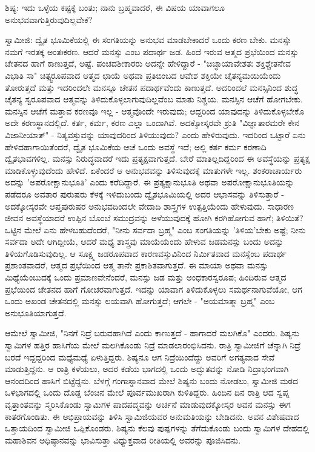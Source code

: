ಶಿಷ್ಯ: ಇದು ಒಳ್ಳೆಯ ಕಷ್ಟಕ್ಕೆ ಬಂತು; ನಾನು ಬ್ರಹ್ಮವಾದರೆ, ಈ ವಿಷಯ ಯಾವಾಗಲೂ ಅನುಭವವಾಗುತ್ತಿರುವುದಿಲ್ಲವೇಕೆ?

ಸ್ವಾಮೀಜಿ: ದ್ವೈತ ಭೂಮಿಕೆಯಲ್ಲಿ ಈ ಸಂಗತಿಯನ್ನು ಅನುಭವ ಮಾಡಬೇಕಾದರೆ ಒಂದು ಕರಣ ಬೇಕು. ಮನಸ್ಸೇ ನಮಗೆ ಇರತಕ್ಕ ಅಂತಃಕರಣ. ಆದರೆ ಮನಸ್ಸು ಎಂಬ ಪದಾರ್ಥ ಜಡ. ಹಿಂದೆ ಇರುವ ಆತ್ಮದ ಪ್ರಭೆಯಿಂದ ಮನಸ್ಸು ಚೇತನದ ಹಾಗೆ ಕಾಣುತ್ತದೆ, ಅಷ್ಟೆ. ಪಂಚದಶೀಕಾರರು ಅದನ್ನೇ ಹೇಳಿದ್ದಾರೆ - "ಚಿಚ್ಛಾಯಾವೇಶತಃ ಶಕ್ತಿಶ್ಚೇತನೇವ ವಿಭಾತಿ ಸಾ" ಚಿತ್ಸ್ವರೂಪವಾದ ಆತ್ಮದ ಛಾಯೆ ಅಥವಾ ಪ್ರತಿಬಿಂಬದ ಆವೇಶ ಶಕ್ತಿಯೇ ಚೈತನ್ಯಮಯಿಯೆಂದು ತೋರುತ್ತದೆ ಮತ್ತು ಇದರಿಂದಲೇ ಮನಸ್ಸೂ ಚೇತನ ಪದಾರ್ಥವೆಂದು ಕಾಣುತ್ತದೆ. ಅದರಿಂದಲೆ ಮನಸ್ಸಿನಿಂದ ಶುದ್ಧ ಚೈತನ್ಯ ಸ್ವರೂಪವಾದ ಆತ್ಮವನ್ನು ತಿಳಿದುಕೊಳ್ಳಲಾಗುವುದಿಲ್ಲವೆಂಬ ಮಾತು ನಿಶ್ಚಯ. ಮನಸ್ಸಿನ ಆಚೆಗೆ ಹೋಗಬೇಕು. ಮನಸ್ಸಿನ ಆಚೆಗೆ ಮತ್ತಾವ ಕರಣವೂ ಇಲ್ಲ - ಆತ್ಮವೊಂದೇ ಇರುವುದು; ಆದ್ದರಿಂದ ಯಾವುದನ್ನು ತಿಳಿದುಕೊಳ್ಳಬೇಕೊ ಅದೇ ಕರಣಸ್ಥಾನದಲ್ಲಿದೆ. ಕರ್ತ, ಕರ್ಮ, ಕರಣ ಎಲ್ಲಾ ಒಂದಾಗಿವೆ. ಅದಕ್ಕೋಸ್ಕರವೇ ಶ್ರುತಿ "ವಿಜ್ಞಾತಾರಮರೇ ಕೇನ ವಿಜಾನೀಯಾತ್" - ನಿತ್ಯವಸ್ತುವನ್ನು ಯಾವುದರಿಂದ ತಿಳಿಯುವುದು? ಎಂದು ಹೇಳಿರುವುದು. ಇದರಿಂದ ಒಟ್ಟಾರೆ ಏನು ಹೇಳಿದಹಾಗಾಯಿತೆಂದರೆ, ದ್ವೈತ ಭೂಮಿಕೆಯ ಆಚೆ ಒಂದು ಅವಸ್ಥೆ ಇದೆ; ಅಲ್ಲಿ ಕರ್ತ ಕರ್ಮ ಕರಣಾದಿ ದ್ವೈತಭಾವಗಳಿಲ್ಲ. ಮನಸ್ಸು ನಿರುದ್ಧವಾದರೆ ಇದು ಪ್ರತ್ಯಕ್ಷವಾಗುತ್ತದೆ. ಬೇರೆ ಮಾತಿಲ್ಲದಿದ್ದರಿಂದ ಈ ಅವಸ್ಥೆಯನ್ನು ಪ್ರತ್ಯಕ್ಷ ಮಾಡಿಕೊಳ್ಳುವುದೆಂದು ಹೇಳಿದೆ. ಏಕೆಂದರೆ ಆ ಅನುಭವವನ್ನು ತಿಳಿಸುವುದಕ್ಕೆ ಮಾತುಗಳೇ ಇಲ್ಲ. ಶಂಕರಾಚಾರ್ಯರು ಅದನ್ನು 'ಅಪರೋಕ್ಷಾನುಭೂತಿ' ಎಂದು ಕರೆದಿದ್ದಾರೆ. ಈ ಪ್ರತ್ಯಕ್ಷಾನುಭೂತಿ ಅಥವಾ ಅಪರೋಕ್ಷಾನುಭೂತಿಯನ್ನು ಪಡೆದರೂ ಅವತಾರ ಪುರುಷರು ಕೆಳಕ್ಕೆ ಇಳಿದುಬಂದು ದ್ವೈತಭೂಮಿಯಲ್ಲಿ ಅದರ ಆಭಾಸವನ್ನು ತಿಳಿಸುತ್ತಾರೆ - ಅದಕ್ಕೋಸ್ಕರವೇ ಆಪ್ತಪುರುಷರ ಅನುಭವದಿಂದಲೇ ವೇದಾದಿ ಶಾಸ್ತ್ರಗಳ ಉತ್ಪತ್ತಿಯೆಂದು ಹೇಳುವುದು. ಸಾಧಾರಣ ಜೀವನ ಅವಸ್ಥೆಯಾದರೆ ಉಪ್ಪಿನ ಬೊಂಬೆ ಸಮುದ್ರವನ್ನು ಅಳೆಯುವುದಕ್ಕೆ ಹೋಗಿ ಕರಗಿಹೋಗುವ ಹಾಗೆ; ತಿಳಿಯಿತೆ? ಒಟ್ಟಿನ ಮೇಲೆ ಏನು ಹೇಳಬಹುದೆಂದರೆ, "ನೀನು ಸರ್ವದಾ ಬ್ರಹ್ಮ" ಎಂಬ ಸಂಗತಿಯನ್ನು 'ತಿಳಿಯ'ಬೇಕು ಅಷ್ಟೆ; ನೀನು ಸರ್ವದಾ ಅದೇ ಆಗಿದ್ದೀಯೆ, ಆದರೆ ಮಧ್ಯೆ ಶಾಸ್ತ್ರವು ಮಾಯೆಯೆಂದು ಹೇಳುವ ಜಡಮನಸ್ಸು ಬಂದು ಅದನ್ನು ತಿಳಿಯಗೊಡಿಸುವುದಿಲ್ಲ. ಆ ಸೂಕ್ಷ್ಮ ಜಡರೂಪವಾದ ಕಾರಣವಸ್ತುವಿನಿಂದ ನಿರ್ಮಿತವಾದ ಮನಸ್ಸೆಂಬ ಪದಾರ್ಥ ಪ್ರಶಾಂತವಾದರೆ, ಆತ್ಮದ ಪ್ರಭೆಯಿಂದ ಆತ್ಮ ತಾನೇ ಪ್ರಕಾಶಿತವಾಗುತ್ತದೆ. ಈ ಮಾಯಾ ಅಥವಾ ಮನಸ್ಸು ಮಿಥ್ಯೆಯೆಂಬುದಕ್ಕೆ ಒಂದು ಪ್ರಮಾಣವೇನೆಂದರೆ, ಮನಸ್ಸು ಜಡ ಮತ್ತು ಅಂಧಕಾರಸ್ವರೂಪ; ಹಿಂದಿರುವ ಆತ್ಮದ ಪ್ರಭೆಯಿಂದ ಚೇತನದ ಹಾಗೆ ಗೋಚರವಾಗುತ್ತದೆ. ಇದನ್ನು ಯಾವಾಗ ತಿಳಿದುಕೊಳ್ಳಲು ಸಮರ್ಥನಾಗುವೆಯೋ, ಆಗ ಒಂದು ಅಖಂಡ ಚೇತನದಲ್ಲಿ ಮನಸ್ಸು ಲಯವಾಗಿ ಹೋಗುತ್ತದೆ; ಆಗಲೇ - "ಅಯಮಾತ್ಮಾ ಬ್ರಹ್ಮ" ಎಂಬ ಅನುಭೂತಿಯಾಗುತ್ತದೆ.

ಆಮೇಲೆ ಸ್ವಾಮೀಜಿ, "ನಿನಗೆ ನಿದ್ರೆ ಬರುವಹಾಗಿದೆ ಎಂದು ಕಾಣುತ್ತದೆ - ಹಾಗಾದರೆ ಮಲಗಿಕೊ" ಎಂದರು. ಶಿಷ್ಯನು ಸ್ವಾಮಿಗಳ ಹತ್ತಿರ ಹಾಸಿಗೆಯ ಮೇಲೆ ಮಲಗಿಕೊಂಡು ನಿದ್ರೆ ಮಾಡಲಾರಂಭಿಸಿದನು. ರಾತ್ರಿ ಸ್ವಾಮೀಜಿಗೆ ಚೆನ್ನಾಗಿ ನಿದ್ರೆ ಬರದೆ ಇದ್ದದ್ದರಿಂದ ಮಧ್ಯೆಮಧ್ಯೆ ಏಳುತ್ತಿದ್ದರು. ಶಿಷ್ಯನೂ ಆಗ ನಿದ್ರೆಯಿಂದೆದ್ದು ಅವರಿಗೆ ಅಗತ್ಯವಾದ ಸೇವೆ ಮಾಡುತ್ತಿದ್ದನು. ಆ ರಾತ್ರಿ ಕಳೆಯಲು, ಅದರ ಕಡೆಯ ಭಾಗದಲ್ಲಿ ಒಂದು ಅದ್ಭುತವನ್ನು ನೋಡಿ ನಿದ್ರಾಭಂಗವಾಗಿ ಆನಂದದಿಂದ ಹಾಸಿಗೆ ಬಿಟ್ಟೆದ್ದನು. ಬೆಳಗ್ಗೆ ಗಂಗಾಸ್ನಾನವಾದ ಮೇಲೆ ಶಿಷ್ಯನು ಬಂದು ನೋಡಲು, ಸ್ವಾಮೀಜಿ ಮಠದ ಒಳಭಾಗದಲ್ಲಿ ಒಂದು ದೊಡ್ಡ ಬೆಂಚಿನ ಮೇಲೆ ಪೂರ್ವಮುಖರಾಗಿ ಕುಳಿತಿದ್ದರು. ಹಿಂದಿನ ದಿನ ರಾತ್ರಿ ಆದ ಸ್ವಪ್ನ ವೃತ್ತಾಂತವನ್ನು ಸ್ಮರಿಸಿಕೊಂಡು ಸ್ವಾಮಿಗಳ ಪಾದಪದ್ಮವನ್ನು ಅರ್ಚನೆ ಮಾಡುವುದಕ್ಕೋಸ್ಕರ ಅವನ ಮನಸ್ಸು ಈಗ ಕಾತರಗೊಂಡಿತು. ಈ ಅಭಿಪ್ರಾಯವನ್ನು ತಿಳಿಸಿ ಸ್ವಾಮಿಜಿಯವರ ಅನುಮತಿಯನ್ನು ಬೇಡಿದನು. ಅವನ ವಿಶೇಷವಾದ ಒತ್ತಾಯದಿಂದ ಸ್ವಾಮೀಜಿ ಒಪ್ಪಿಕೊಂಡರು. ಶಿಷ್ಯನು ಕೆಲವು ಪುಷ್ಪಗಳನ್ನು ತೆಗೆದುಕೊಂಡು ಬಂದು ಸ್ವಾಮಿಗಳ ದೇಹದಲ್ಲಿ ಮಹಾಶಿವನ ಅಧಿಷ್ಠಾನವನ್ನು ಭಾವಿಸುತ್ತಾ ವಿಧ್ಯುಕ್ತವಾದ ರೀತಿಯಲ್ಲಿ ಅವರನ್ನು ಪೂಜಿಸಿದನು.

